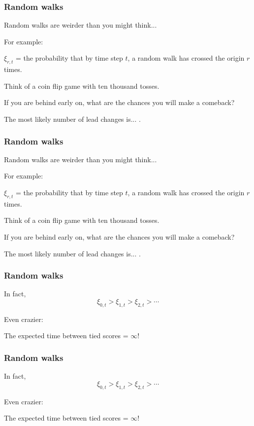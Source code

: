 \begin{frame}
  \frametitle{Random walks}

Random walks are weirder than you might think...

For example:

$\xi_{r,t}$ = the probability that by time step $t$,
a random walk has crossed the origin $r$ times.

Think of a coin flip game with ten thousand tosses.

If you are behind early on, what are the chances you
will make a comeback?

The most likely number of lead changes is...  
.


\end{frame}

\begin{frame}
  \frametitle{Random walks}

Random walks are weirder than you might think...

For example:

$\xi_{r,t}$ = the probability that by time step $t$,
a random walk has crossed the origin $r$ times.

Think of a coin flip game with ten thousand tosses.

If you are behind early on, what are the chances you
will make a comeback?

The most likely number of lead changes is...  
.


\end{frame}

\begin{frame}
  \frametitle{Random walks}

In fact,
$$\xi_{0,t} > \xi_{1,t} > \xi_{2,t} > \cdots $$

\inv 

Even crazier:

The expected time between tied scores = $\infty$!

\end{frame}

\begin{frame}
  \frametitle{Random walks}

In fact,
$$\xi_{0,t} > \xi_{1,t} > \xi_{2,t} > \cdots $$

Even crazier:

The expected time between tied scores = $\infty$!

\end{frame}

